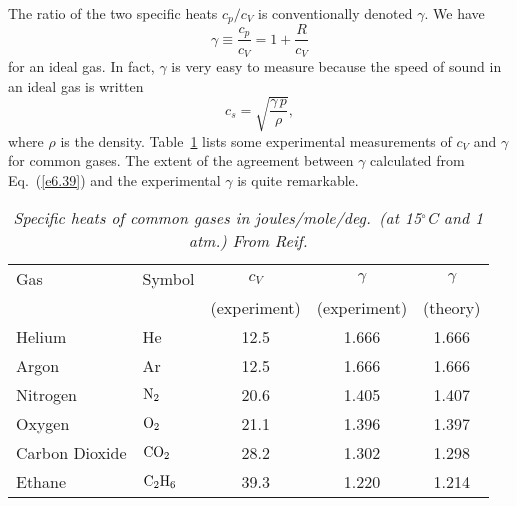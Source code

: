The ratio of the two specific heats $c_p/ c_V$ is conventionally denoted
$\gamma$. We have 
\begin{equation}
\gamma \equiv \frac{c_p}{c_V} = 1 +\frac{R}{c_V}\label{e6.39}
\end{equation}
for an ideal gas. In fact, $\gamma$ is very easy to measure because the speed
of sound in an ideal gas is written
\begin{equation}
c_s = \sqrt{\frac{\gamma \,p}{\rho}},
\end{equation}
where $\rho$ is the density. Table~\ref{tab1}
lists some experimental measurements
of $c_V$ and $\gamma$ for common gases. The extent of the agreement between $\gamma$
calculated from Eq.~(\ref{e6.39}) and the experimental $\gamma$ is quite remarkable.
\begin{table}
\centering
\begin{tabular} {llccc} \hline
Gas & Symbol & $c_V$ & $\gamma$ & $\gamma$ \\
    &        & (experiment) & (experiment) & (theory) \\ \hline
Helium & He & 12.5 & 1.666 & 1.666 \\
Argon & Ar &  12.5 & 1.666 & 1.666 \\
Nitrogen & ${\rm N}_2$ & 20.6 & 1.405 & 1.407 \\
Oxygen & ${\rm O}_2$ & 21.1 & 1.396 & 1.397 \\
Carbon Dioxide & ${\rm CO}_2$& 28.2 & 1.302 & 1.298\\
Ethane & ${\rm C}_2 {\rm H}_6$ & 39.3 & 1.220 & 1.214\\ \hline
\end{tabular}
\caption{\em Specific heats of common gases in joules/mole/deg.\ (at 15$^\circ$C and 1
 atm.) From Reif.}\label{tab1}
\end{table}

